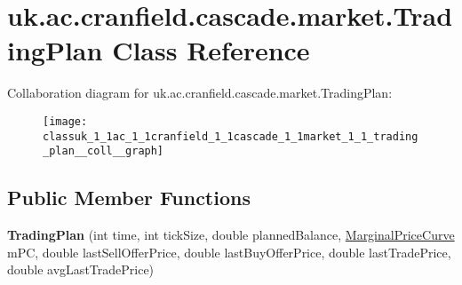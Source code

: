 \hypertarget{classuk_1_1ac_1_1cranfield_1_1cascade_1_1market_1_1_trading_plan}{\section{uk.\-ac.\-cranfield.\-cascade.\-market.\-Trading\-Plan Class Reference}
\label{classuk_1_1ac_1_1cranfield_1_1cascade_1_1market_1_1_trading_plan}
}


Collaboration diagram for uk.\-ac.\-cranfield.\-cascade.\-market.\-Trading\-Plan\-:\nopagebreak
\begin{figure}[H]
\begin{center}
\leavevmode
\texttt{[image: classuk\_1\_1ac\_1\_1cranfield\_1\_1cascade\_1\_1market\_1\_1\_trading\_plan\_\_coll\_\_graph]}
\end{center}
\end{figure}
\subsection*{Public Member Functions}
\begin{DoxyCompactItemize}
\item 
\hypertarget{classuk_1_1ac_1_1cranfield_1_1cascade_1_1market_1_1_trading_plan_aace7d18b273cc25d69e2c3a2991dde4b}{{\bfseries Trading\-Plan} (int time, int tick\-Size, double planned\-Balance, \hyperlink{classuk_1_1ac_1_1cranfield_1_1cascade_1_1market_1_1_marginal_price_curve}{Marginal\-Price\-Curve} m\-P\-C, double last\-Sell\-Offer\-Price, double last\-Buy\-Offer\-Price, double last\-Trade\-Price, double avg\-Last\-Trade\-Price)}\label{classuk_1_1ac_1_1cranfield_1_1cascade_1_1market_1_1_trading_plan_aace7d18b273cc25d69e2c3a2991dde4b}

\end{DoxyCompactItemize}
